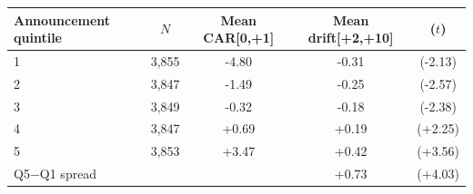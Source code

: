 \begin{tabular}{lcccc}
\toprule
Announcement quintile & $N$ & Mean CAR[0,+1] & Mean drift[+2,+10] & ($t$) \\
\midrule
1 & 3,855 & -4.80 & -0.31 & (-2.13) \\
2 & 3,847 & -1.49 & -0.25 & (-2.57) \\
3 & 3,849 & -0.32 & -0.18 & (-2.38) \\
4 & 3,847 & +0.69 & +0.19 & (+2.25) \\
5 & 3,853 & +3.47 & +0.42 & (+3.56) \\
\midrule Q5$-$Q1 spread & & & +0.73 & (+4.03) \\
\bottomrule
\end{tabular}
